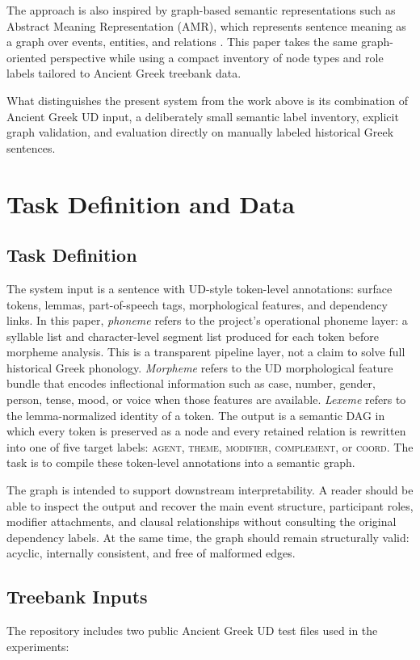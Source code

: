 \documentclass[11pt]{article}
\begin{document}
The approach is also inspired by graph-based semantic representations such as
Abstract Meaning Representation (AMR), which represents sentence meaning as a
graph over events, entities, and relations \citep{banarescu2013amr}. This
paper takes the same graph-oriented perspective while using a compact inventory
of node types and role labels tailored to Ancient Greek treebank data.

What distinguishes the present system from the work above is its combination of
Ancient Greek UD input, a deliberately small semantic label inventory, explicit
graph validation, and evaluation directly on manually labeled historical Greek
sentences.

\section{Task Definition and Data}
\subsection{Task Definition}
The system input is a sentence with UD-style token-level annotations: surface
tokens, lemmas, part-of-speech tags, morphological features, and dependency
links. In this paper, \emph{phoneme} refers to the project's operational
phoneme layer: a syllable list and character-level segment list produced for
each token before morpheme analysis. This is a transparent pipeline layer, not a
claim to solve full historical Greek phonology. \emph{Morpheme} refers to the UD
morphological feature bundle that encodes inflectional information such as case,
number, gender, person, tense, mood, or voice when those features are available.
\emph{Lexeme} refers to the lemma-normalized identity of a token. The output is a semantic DAG in
which every token is preserved as a node and every retained relation is rewritten
into one of five target labels:
\textsc{agent}, \textsc{theme}, \textsc{modifier}, \textsc{complement}, or
\textsc{coord}. The task is to compile these token-level annotations into a
semantic graph.

The graph is intended to support downstream interpretability. A reader should be
able to inspect the output and recover the main event structure, participant
roles, modifier attachments, and clausal relationships without consulting the
original dependency labels. At the same time, the graph should remain
structurally valid: acyclic, internally consistent, and free of malformed edges.

\subsection{Treebank Inputs}
The repository includes two public Ancient Greek UD test files used in the
experiments:
\end{document}

